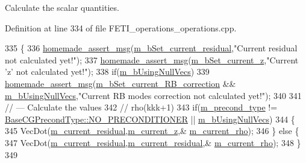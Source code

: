 Calculate the scalar quantities. 



Definition at line 334 of file F\+E\+T\+I\+\_\+operations\+\_\+operations.\+cpp.


\begin{DoxyCode}
335 \{
336     \hyperlink{common__header_8h_a593ccc80b790b2268653fcf6597bf451}{homemade\_assert\_msg}(\hyperlink{classcarl_1_1_f_e_t_i___operations_a1f1f890054d63bdf25937e6bf66fa5ce}{m\_bSet\_current\_residual},\textcolor{stringliteral}{"Current residual
       not calculated yet!"});
337     \hyperlink{common__header_8h_a593ccc80b790b2268653fcf6597bf451}{homemade\_assert\_msg}(\hyperlink{classcarl_1_1_f_e_t_i___operations_a979d0cf4b56999fcd126825b60ec192f}{m\_bSet\_current\_z},\textcolor{stringliteral}{"Current 'z' not calculated
       yet!"});
338     \textcolor{keywordflow}{if}(\hyperlink{classcarl_1_1_f_e_t_i___operations_aff68699ccceb6e1debc4ecab97dde2ff}{m\_bUsingNullVecs})
339     \hyperlink{common__header_8h_a593ccc80b790b2268653fcf6597bf451}{homemade\_assert\_msg}(\hyperlink{classcarl_1_1_f_e_t_i___operations_a4ba412e4dc2d64b62ebcf81773ed5ce8}{m\_bSet\_current\_RB\_correction} && 
      \hyperlink{classcarl_1_1_f_e_t_i___operations_aff68699ccceb6e1debc4ecab97dde2ff}{m\_bUsingNullVecs},\textcolor{stringliteral}{"Current RB modes correction not calculated yet!"});
340 
341     \textcolor{comment}{// --- Calculate the values}
342     \textcolor{comment}{// rho(kkk+1)}
343     \textcolor{keywordflow}{if}(\hyperlink{classcarl_1_1_f_e_t_i___operations_a76e474f6c1b8bb99cee6a6645f15b25b}{m\_precond\_type} != \hyperlink{namespacecarl_ad52f21755b51ffa926038b59ae194ea8ad142a27fc7dfef6e36c5d01689880cc4}{BaseCGPrecondType::NO\_PRECONDITIONER}
       || \hyperlink{classcarl_1_1_f_e_t_i___operations_aff68699ccceb6e1debc4ecab97dde2ff}{m\_bUsingNullVecs})
344     \{
345         VecDot(\hyperlink{classcarl_1_1_f_e_t_i___operations_a6b1154885f5b8303ecbd32ea76df40e5}{m\_current\_residual},\hyperlink{classcarl_1_1_f_e_t_i___operations_a56038a186d124078ad4b37c631f50ff0}{m\_current\_z},&
      \hyperlink{classcarl_1_1_f_e_t_i___operations_a1ecd729d4399772a6741c3b4bf69a69a}{m\_current\_rho});
346     \} \textcolor{keywordflow}{else} \{
347         VecDot(\hyperlink{classcarl_1_1_f_e_t_i___operations_a6b1154885f5b8303ecbd32ea76df40e5}{m\_current\_residual},\hyperlink{classcarl_1_1_f_e_t_i___operations_a6b1154885f5b8303ecbd32ea76df40e5}{m\_current\_residual},&
      \hyperlink{classcarl_1_1_f_e_t_i___operations_a1ecd729d4399772a6741c3b4bf69a69a}{m\_current\_rho});
348     \}
349 

\end{DoxyCode}
